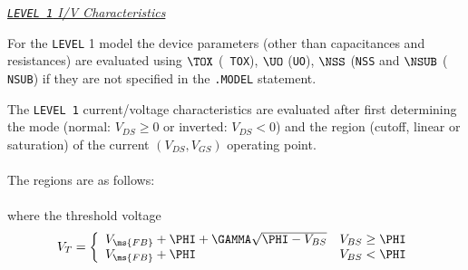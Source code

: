 \noindent\underline{\sl {\tt LEVEL 1} I/V Characteristics}\\[0.1in]
    

For the {\tt LEVEL} 1 model the device parameters (other than
capacitances and resistances) are evaluated using $\TOX$ ({\tt
TOX}), $\UO$ ({\tt UO}), $\NSS$ ({\tt NSS} and $\NSUB$ ({\tt
NSUB}) if they are not specified in the {\tt .MODEL} statement.

The {\tt LEVEL 1} current/voltage characteristics are evaluated
after first determining the mode (normal: $V_{DS} \ge 0$ or
inverted: $V_{DS} < 0$) and the region (cutoff, linear or
saturation) of the current
$(V_{DS}, V_{GS})$ operating point.\\[0.1in]

\\[0.2in]
The regions are as follows:\\[0.1in]
\hspace*{\fill}\\[0.1in]
where the threshold voltage
\begin{equation}
V_{T} = \left\{ \begin{array}{ll}
          V_{\ms{FB}} + \PHI + \GAMMA \sqrt{\PHI - V_{BS}}
               & V_{BS} \ge \PHI \\
          V_{\ms{FB}} + \PHI & V_{BS} < \PHI
          \end{array} \right. %
\end{equation}

